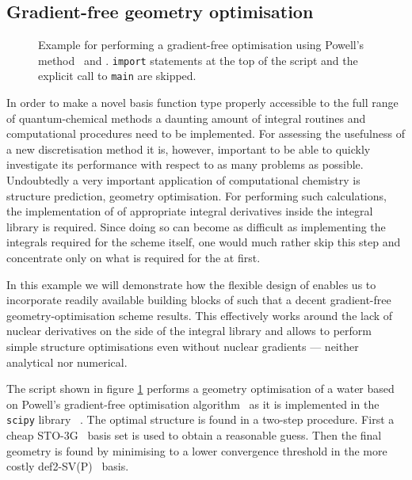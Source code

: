 \subsection{Gradient-free geometry optimisation}
\label{sec:ex:geo}

\begin{figure}
	\centering
	\begin{minipage}{0.58\textwidth}
	
	\end{minipage}
	\caption[\python script for performing gradient-free optimisation]{
		Example for performing a gradient-free optimisation
		using Powell's method~\cite{Powell1964,Press1992} and \molsturm.
		\python \texttt{import} statements at the top of the script
		and the explicit call to \texttt{main} are skipped.
	}
	\label{fig:codeGeoOpt}
\end{figure}
\newcommand{\lgbasone}{36\xspace}
\newcommand{\lgbastwo}{41\xspace}

In order to make a novel basis function type properly accessible
to the full range of quantum-chemical methods
a daunting amount of integral routines and computational procedures
need to be implemented.
For assessing the usefulness of a new discretisation method it is, however,
important to be able to quickly investigate its performance with respect to
as many problems as possible.
Undoubtedly a very important application of computational chemistry
is structure prediction, \ie geometry optimisation.
For performing such calculations,
the implementation of of appropriate integral derivatives
inside the integral library is required.
Since doing so can become as difficult as implementing the integrals
required for the \SCF scheme itself,
one would much rather skip this step and concentrate
only on what is required for the \SCF at first.

In this example we will demonstrate how the flexible design of \molsturm
enables us to incorporate readily available building blocks of \python
such that a decent gradient-free geometry-optimisation scheme results.
This effectively works around the lack of nuclear derivatives
on the side of the integral library
and allows to perform simple structure optimisations
even without nuclear gradients --- neither analytical nor numerical.

The script shown in figure \ref{fig:codeGeoOpt}
performs a geometry optimisation of a water
based on Powell's gradient-free optimisation algorithm~\cite{Powell1964,Press1992}
as it is implemented in the \texttt{scipy} library%
~\cite{Walt2011,scipyWeb}.
The optimal structure is found in a two-step procedure.
First a cheap \mbox{STO-3G}~\cite{Hehre1969} basis set is used to obtain
a reasonable guess.
Then the final geometry is found
by minimising to a lower convergence threshold in the more costly
\mbox{def2-SV(P)}~\cite{Weigend2005} basis.


